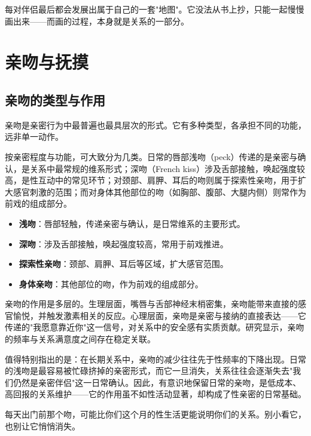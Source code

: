 \documentclass[12pt,UTF8]{ctexbook}
\newcommand{\keyword}[1]{\textbf{#1}}
\begin{document}
\begin{tcolorbox}[colback=pink!5!white,colframe=red!50!black,title=贴心小叮咛]
	每对伴侣最后都会发展出属于自己的一套"地图"。它没法从书上抄，只能一起慢慢画出来——而画的过程，本身就是关系的一部分。
\end{tcolorbox}

\section{亲吻与抚摸}
\subsection{亲吻的类型与作用}

亲吻是亲密行为中最普遍也最具层次的形式。它有多种类型，各承担不同的功能，远非单一动作。

按亲密程度与功能，可大致分为几类。日常的唇部浅吻（peck）传递的是亲密与确认，是关系中最常规的维系形式；深吻（French kiss）涉及舌部接触，唤起强度较高，是性互动中的常见环节；对颈部、肩胛、耳后的吻则属于探索性亲吻，用于扩大感官刺激的范围；而对身体其他部位的吻（如胸部、腹部、大腿内侧）则常作为前戏的组成部分。

\begin{itemize}
	\item \keyword{浅吻}：唇部轻触，传递亲密与确认，是日常维系的主要形式。
	\item \keyword{深吻}：涉及舌部接触，唤起强度较高，常用于前戏推进。
	\item \keyword{探索性亲吻}：颈部、肩胛、耳后等区域，扩大感官范围。
	\item \keyword{身体亲吻}：其他部位的吻，作为前戏的组成部分。
\end{itemize}

亲吻的作用是多层的。生理层面，嘴唇与舌部神经末梢密集，亲吻能带来直接的感官愉悦，并触发激素相关的反应。心理层面，亲吻是亲密与接纳的直接表达——它传递的"我愿意靠近你"这一信号，对关系中的安全感有实质贡献。研究显示，亲吻的频率与关系满意度之间存在稳定关联。

值得特别指出的是：在长期关系中，亲吻的减少往往先于性频率的下降出现。日常的浅吻是最容易被忙碌挤掉的亲密形式，而它一旦消失，关系往往会逐渐失去"我们仍然是亲密伴侣"这一日常确认。因此，有意识地保留日常的亲吻，是低成本、高回报的关系维护——它的作用虽不如性活动显著，却构成了性亲密的日常基础。

\begin{tcolorbox}[colback=pink!5!white,colframe=red!50!black,title=贴心小叮咛]
	每天出门前那个吻，可能比你们这个月的性生活更能说明你们的关系。别小看它，也别让它悄悄消失。
\end{tcolorbox}
\end{document}
